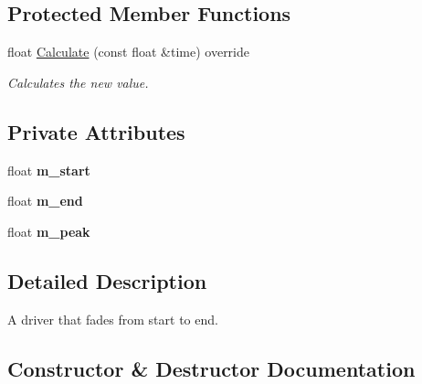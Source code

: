 \subsection*{Protected Member Functions}
\begin{DoxyCompactItemize}
\item 
float \hyperlink{class_flounder_1_1_driver_fade_abf85b48408ddb95e57d1e93c3ea6eb09}{Calculate} (const float \&time) override
\begin{DoxyCompactList}\small\item\em Calculates the new value. \end{DoxyCompactList}\end{DoxyCompactItemize}
\subsection*{Private Attributes}
\begin{DoxyCompactItemize}
\item 
\mbox{\label{class_flounder_1_1_driver_fade_a186036c59e6b775a07ff2addefcaa1c3}} 
float {\bfseries m\+\_\+start}
\item 
\mbox{\label{class_flounder_1_1_driver_fade_a231e373d1e89a83b4cfef27d0dac50fc}} 
float {\bfseries m\+\_\+end}
\item 
\mbox{\label{class_flounder_1_1_driver_fade_a85efb1864182ea56511cef36b2a054a4}} 
float {\bfseries m\+\_\+peak}
\end{DoxyCompactItemize}


\subsection{Detailed Description}
A driver that fades from start to end. 



\subsection{Constructor \& Destructor Documentation}
\mbox{\label{class_flounder_1_1_driver_fade_a47a59ade66edc424073078463ee2d9df}} 
